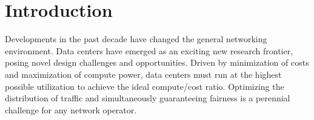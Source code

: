 
\section{Introduction}
\label{sec:intro}

%
%

Developments in the past decade have changed the general networking 
environment. Data centers have emerged as an exciting new research frontier, 
posing novel design challenges and opportunities. Driven by minimization of 
costs and maximization of compute power, data centers must run at the highest 
possible utilization to achieve the ideal compute/cost ratio.
Optimizing the distribution of traffic and simultaneously guaranteeing fairness 
is a perennial challenge for any network operator.

